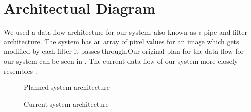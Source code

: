 \chapter{Architectual Diagram}

We used a data-flow architecture for our system, also known as a pipe-and-filter architecture. 
The system has an array of pixel values for an image which gets modified by each filter it passes through.Our original plan for the data flow for our system can be seen in . The current data flow of our system more closely resembles .
\newline

\begin{figure}[!h]
\noindent\resizebox{\textwidth}{!}{
  
}
\caption{Planned system architecture}
\label{fig:architecture}
\end{figure}

\begin{figure}[!h]
	\noindent\resizebox{\textwidth}{!}{
		
	}
	\caption{Current system architecture}
	\label{fig:architecture-new}
\end{figure}